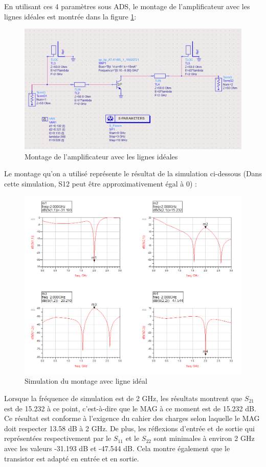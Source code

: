 \documentclass[french]{article}
\begin{document}
En utilisant ces 4 paramètres sous ADS, le montage de l’amplificateur avec les lignes idéales est montrée dans la figure \ref{fig:ligne_ideal}:
\begin{figure}[H]
	\centering
	\includegraphics[width=0.9\linewidth]{../5SynthAmp/ligne_ideal}
	\caption{Montage de l’amplificateur avec les lignes idéales}
	\label{fig:ligne_ideal}
\end{figure}

Le montage qu’on a utilisé représente le résultat de la simulation ci-dessous (Dans cette simulation, S12 peut être approximativement égal à 0) :
\begin{figure}[H]
	\centering
	\includegraphics[width=1.2\linewidth]{../5SynthAmp/ligne_ideal_Sparametres}
	\caption{Simulation du montage avec ligne idéal}
	\label{fig:ligne_ideal_Sparametres}
\end{figure}

Lorsque la fréquence de simulation est de 2 GHz, les résultats montrent que $S_{21}$ est de 15.232 à ce point, c'est-à-dire que le MAG à ce moment est de 15.232 dB. Ce résultat est conforme à l'exigence du cahier des charges selon laquelle le MAG doit respecter 13.58 dB à 2 GHz. De plus, les réflexions d’entrée et de sortie qui représentées respectivement par le $S_{11}$ et le $S_{22}$ sont minimales à environ 2 GHz avec les valeurs -31.193 dB et -47.544 dB. Cela montre également que le transistor est adapté en entrée et en sortie.
\end{document}
